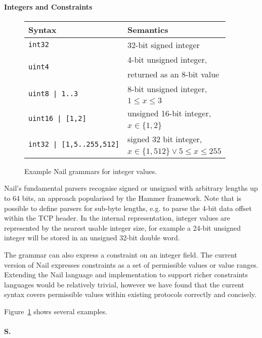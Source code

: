 \paragraph{Integers and Constraints}
\begin{figure}[tb]
\begin{tabular}{ll}
\toprule
\bf Syntax & \bf Semantics \\
\midrule
\texttt{int32} & 32-bit signed integer \\
\multirow{2}{*}{\texttt{uint4}}
  & 4-bit unsigned integer, \\
  & returned as an 8-bit value \\
\multirow{2}{*}{\texttt{uint8 | 1..3}}
  & 8-bit unsigned integer, \\
  & $1\leq x \leq 3$ \\
\multirow{2}{*}{\texttt{uint16 | [1,2]}}
  & unsigned 16-bit integer, \\
  & $x \in \{1,2\}$ \\
\multirow{2}{*}{\texttt{int32 | [1,5..255,512]}}
  & signed 32 bit integer, \\
  & $x \in \{ 1, 512 \} \vee 5\leq x\leq 255$ \\
\bottomrule
\end{tabular}
\caption{Example Nail grammars for integer values.}
\label{fig:range}
\end{figure}

Nail's fundamental parsers recognise signed or unsigned with arbitrary lengths up to 64 bits, an
approach popularised by the Hammer framework.\cite{hammer-parser}  
Note that is possible to define parsers for sub-byte lengths, e.g. to parse the 4-bit
data offset within the TCP header.  In the internal representation, integer values are represented
by the nearest usable integer size, for example a 24-bit unsigned integer will be stored in an
unsigned 32-bit double word.

The grammar can also express a constraint on an integer field. The current version of Nail expresses
constraints as a set of permissible values or value ranges. Extending the Nail language and
implementation to support richer constraints languages would be relatively trivial, however we have
found that the current syntax covers permissible values within existing protocols correctly and
concisely.

Figure~\ref{fig:range} shows several examples.

\paragraph{S.}

